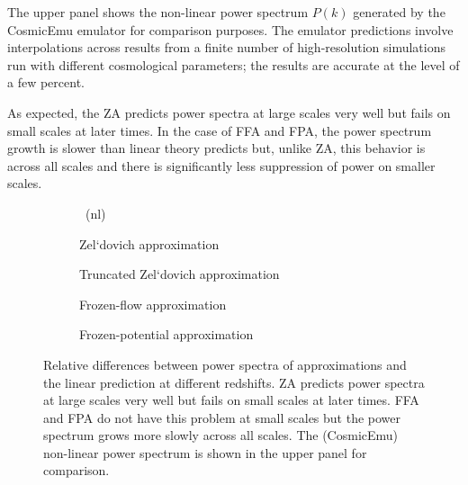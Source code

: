 The upper panel shows the non-linear power spectrum $P(k)$ generated by the CosmicEmu emulator \parencite{Heitmann:2015xma} for comparison purposes. The emulator predictions involve interpolations across results from a finite number of high-resolution simulations run with different cosmological parameters; the results are accurate at the level of a few percent.

As expected, the ZA predicts power spectra at large scales very well but fails on small scales at later times. In the case of FFA and FPA, the power spectrum growth is slower than linear theory predicts but, unlike ZA, this behavior is across all scales and there is significantly less suppression of power on smaller scales.
\begin{figure*}
\centering
	\begin{subfigure}{1.0\textwidth}
	\end{subfigure}
	\begin{subfigure}{0.5\textwidth}
		\caption{\LCDM\ (nl)}	
	\end{subfigure}
	\begin{subfigure}{0.5\textwidth}
		\caption{Zel`dovich approximation}
	\end{subfigure}%
	\begin{subfigure}{0.5\textwidth}
		\caption{Truncated Zel`dovich approximation}
	\end{subfigure}
	\begin{subfigure}{0.5\textwidth}
		\caption{Frozen-flow approximation}
	\end{subfigure}%
	\begin{subfigure}{0.5\textwidth}
		\caption{Frozen-potential approximation}
	\end{subfigure}
	\caption{Relative differences between power spectra of approximations and the linear prediction at different redshifts. ZA predicts power spectra at large scales very well but fails on small scales at later times. FFA and FPA do not have this problem at small scales but the power spectrum grows more slowly across all scales. The (CosmicEmu) non-linear power spectrum is shown in the upper panel for comparison.}
	\label{fig:pwr_spec_diff}
\end{figure*}